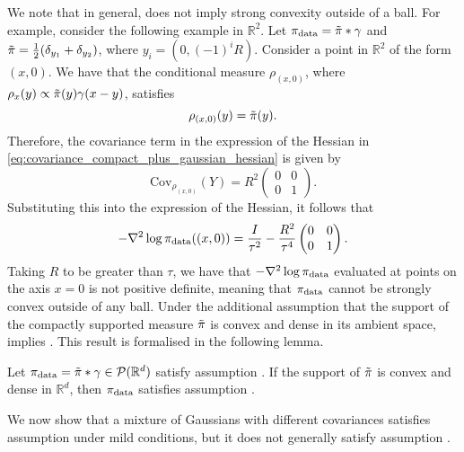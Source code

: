 We note that in general,  does not imply strong convexity outside of a ball. 
For example, consider the following example in $\mathbb{R}^2$. Let $\operatorname*{\pi_{\text{data}}} = \Tilde{\pi} * \gamma$ and
$\Tilde{\pi} = \frac{1}{2}(\delta_{y_1} +\delta_{y_2})$, where $y_i = (0, (-1)^iR)$. Consider a point in $\mathbb{R}^2$ of the form $(x, 0)$. We have that the conditional measure $\rho_{(x,0)}$, where $\rho_x(y) \propto \Tilde{\pi}(y)\gamma(x-y)$, satisfies
\begin{equation*}
    \rho_{(x,0)}(y) = \Tilde{\pi}(y).
\end{equation*}
Therefore, the covariance term in the expression of the Hessian in \eqref{eq:covariance_compact_plus_gaussian_hessian} is given by
\begin{equation*}
    \text{Cov}_{\rho_{(x,0)}}(Y) = R^2\left(\begin{matrix}
        0& 0\\
        0& 1
    \end{matrix}\right).
\end{equation*}
Substituting this into the expression of the Hessian, it follows that
\begin{equation*}
    -\nabla^2\log\operatorname*{\pi_{\text{data}}} ((x, 0)) = \frac{I}{\tau^2} - \frac{R^2}{\tau^4}\left(\begin{matrix}
        0& 0\\
        0& 1
    \end{matrix}\right).
\end{equation*}
Taking $R$ to be greater than $\tau$, we have that  $-\nabla^2\log\operatorname*{\pi_{\text{data}}}$ evaluated at points on the axis $x=0$ is not positive definite, meaning that $\operatorname*{\pi_{\text{data}}}$ cannot be strongly convex outside of any ball. 
Under the additional assumption that the support of the compactly supported measure $\Tilde{\pi}$ is convex and dense in its ambient space,  implies .
This result is formalised in the following lemma.
\begin{lemma}
    Let $\operatorname*{\pi_{\text{data}}}=\Tilde{\pi}*\gamma\in\mathcal{P}(\mathbb{R}^d)$ satisfy assumption . If the support of $\Tilde{\pi}$ is convex and dense in $\mathbb{R}^d$, then $\operatorname*{\pi_{\text{data}}}$ satisfies assumption .
\end{lemma}

 
We now show that a mixture of Gaussians with different covariances satisfies assumption  under mild conditions, but it does not generally satisfy assumption .

